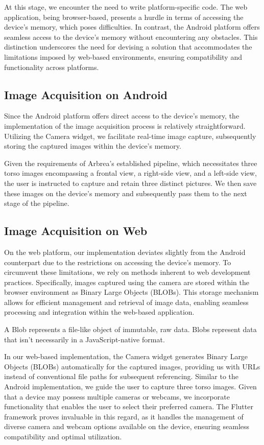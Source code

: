 At this stage, we encounter the need to write platform-specific code. The web application, being browser-based, presents a hurdle in terms of accessing the device's memory, 
which poses difficulties. In contrast, the Android platform offers seamless access to the device's memory without encountering any obstacles. 
This distinction underscores the need for devising a solution that accommodates the limitations imposed by web-based environments, ensuring compatibility and functionality across platforms.

\subsection{Image Acquisition on Android}

Since the Android platform offers direct access to the device's memory, the implementation of the image acquisition process is relatively straightforward. 
Utilizing the Camera widget, we facilitate real-time image capture, subsequently storing the captured images within the device's memory. 

Given the requirements of Arbrea's established pipeline, 
which necessitates three torso images encompassing a frontal view, a right-side view, and a left-side view, the user is instructed to capture and retain three distinct pictures. 
We then save these images on the device's memory and subsequently pass them to the next stage of the pipeline.

\subsection{Image Acquisition on Web}

On the web platform, our implementation deviates slightly from the Android counterpart due to the restrictions on accessing the device's memory. 
To circumvent these limitations, we rely on methods inherent to web development practices. Specifically, images captured using the camera are stored within the browser environment as Binary Large Objects (BLOBs). 
This storage mechanism allows for efficient management and retrieval of image data, enabling seamless processing and integration within the web-based application.

A Blob represents a file-like object of immutable, raw data. Blobs represent data that isn't necessarily in a JavaScript-native format. 

In our web-based implementation, the Camera widget generates Binary Large Objects (BLOBs) automatically for the captured images, providing us with URLs instead of conventional file paths for subsequent referencing. 
Similar to the Android implementation, we guide the user to capture three torso images. Given that a device may possess multiple cameras or webcams, we incorporate functionality that enables the user 
to select their preferred camera. The Flutter framework proves invaluable in this regard, as it handles the management of diverse camera and webcam options available on the device, 
ensuring seamless compatibility and optimal utilization.

